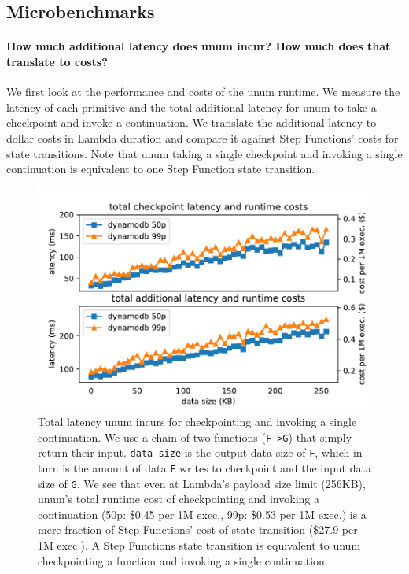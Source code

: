 \subsection{Microbenchmarks}


\paragraph{How much additional latency does unum incur? How much does that
translate to costs?}

We first look at the performance and costs of the unum runtime. We measure the
latency of each primitive and the total additional latency for unum to take a
checkpoint and invoke a continuation. We translate the additional latency to
dollar costs in Lambda duration and compare it against Step Functions' costs
for state transitions. Note that unum taking a single checkpoint and invoking
a single continuation is equivalent to one Step Function state transition.

\begin{figure}[t!]
    \centering
    \includegraphics[width=\columnwidth]{figures/TotalAdditionalLatency.pdf}
    \caption{Total latency unum incurs for checkpointing and invoking a single
    continuation. We use a chain of two functions (\texttt{F->G}) that simply
    return their input. \texttt{data size} is the output data size of
    \texttt{F}, which in turn is the amount of data \texttt{F} writes to
    checkpoint and the input data size of \texttt{G}. We see that even at
    Lambda's payload size limit (256KB), unum's total runtime cost of
    checkpointing and invoking a continuation (50p: \$0.45 per 1M exec., 99p:
    \$0.53 per 1M exec.) is a mere fraction of Step Functions' cost of state
    transition (\$27.9 per 1M exec.). A Step Functions state transition is
    equivalent to unum checkpointing a function and invoking a single
    continuation.}
    \label{fig:totallatency}
\end{figure}


